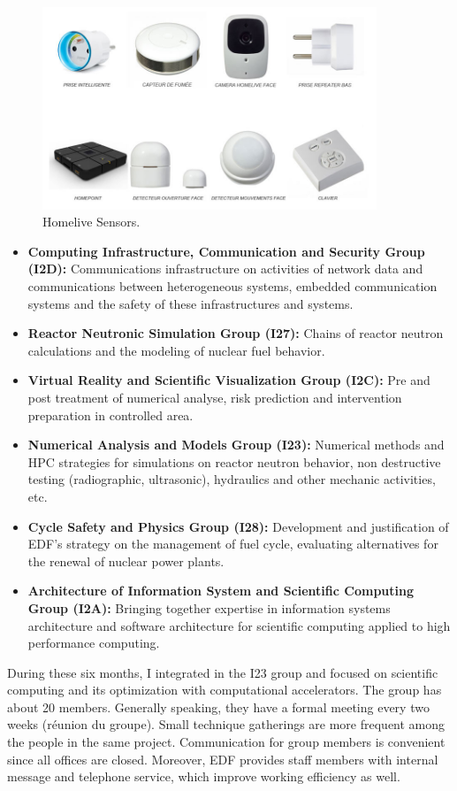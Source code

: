\begin{figure}[htbp]
	\centering
		\includegraphics[width=10cm]{Figures/home-live_capteurs.jpg}
	\caption[Homelive Sensors]{Homelive Sensors.}%
	\label{fig:2}
\end{figure}

\begin{itemize}
  \it
  \item \textbf{Computing Infrastructure, Communication and Security Group (I2D): }Communications infrastructure on activities of network data and communications between heterogeneous systems, embedded communication systems and the safety of these infrastructures and systems.
  \item \textbf{Reactor Neutronic Simulation Group (I27):} Chains of reactor neutron calculations and the modeling of nuclear fuel behavior.
  \item \textbf{Virtual Reality and Scientific Visualization Group (I2C):} Pre and post treatment of numerical analyse, risk prediction and intervention preparation in controlled area.
	\item \textbf{Numerical Analysis and Models Group (I23):} Numerical methods and HPC strategies  for simulations on reactor neutron behavior, non destructive testing (radiographic, ultrasonic), hydraulics and other mechanic activities, etc.
	\item \textbf{Cycle Safety and Physics Group (I28):} Development and justification of EDF's strategy on the management of fuel cycle, evaluating alternatives for the renewal of nuclear power plants.
	\item \textbf{Architecture of Information System and Scientific Computing Group (I2A):} Bringing together expertise in information systems architecture and software architecture for scientific computing applied to high performance computing.
\end{itemize}
During these six months, I integrated in the I23 group and focused on scientific computing and its optimization with computational accelerators. The group has about 20 members. Generally speaking, they have a formal meeting every two weeks (réunion du groupe). Small technique gatherings are more frequent among the people in the same project. Communication for group members is convenient since all offices are closed. Moreover, EDF provides staff members with internal message and telephone service, which improve working efficiency as well.

